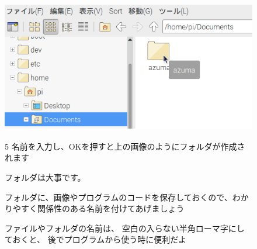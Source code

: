 \documentclass[a4paper,12pt]{jarticle}
\begin{document}
\begin{figure}[hb]
\centering
\includegraphics[width=11.398cm,height=5.72cm]{textbook-img038.png}
\centering
\begin{minipage}{13.001cm}
5
名前を入力し、OKを押すと上の画像のようにフォルダが作成されます
\end{minipage}

\end{figure}
\begin{figure}[hb]
\centering
\begin{minipage}{0.8\textwidth}
	{	\large
フォルダは大事です。

フォルダに、画像やプログラムのコードを保存しておくので、わかりやすく関係性のある名前を付けてあげましょう

\bigskip
ファイルやフォルダの名前は、
空白の入らない半角ローマ字にしておくと、
後でプログラムから使う時に便利だよ
	}
\end{minipage}
\end{figure}
\clearpage
\end{document}
